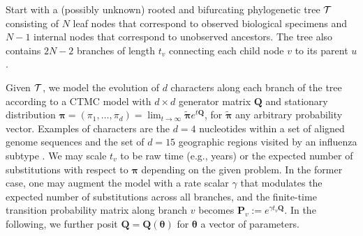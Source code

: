 \documentclass[9pt,twocolumn,twoside]{pnas-new}
\newcommand{\phylogeny}{{\cal T}}
\newcommand{\?}{\textbf{?}}
\newcommand{\QQ}{\mathbf{Q}}
\newcommand{\ttheta}{\boldsymbol{\theta}}
\newcommand{\ppi}{\boldsymbol{\pi}}
\renewcommand{\P}{\mathbf{P}}
\begin{document}
Start with a (possibly unknown) rooted and bifurcating phylogenetic
tree $\phylogeny$ consisting of $N$ leaf nodes that correspond to
observed biological specimens and $N-1$ internal nodes that correspond
to unobserved ancestors.  The tree also contains $2N-2$ branches of
length $t_v$ connecting each child node $v$ to its parent $u$.

Given $\phylogeny$, we model the evolution of $d$ characters along
each branch of the tree according to a CTMC model with $d\times d$
generator matrix $\QQ$ and stationary distribution
$\ppi=(\pi_1,\dots,\pi_d)=\lim_{t\rightarrow
  \infty}\widetilde{\ppi}e^{t\QQ}$, for $\widetilde{\ppi}$ any
arbitrary probability vector.  Examples of characters are the $d=4$
nucleotides within a set of aligned genome sequences
\cite{jukes1969evolution} and the set of $d=15$ geographic regions
visited by an influenza subtype \cite{lemey2014unifying}.  We may
scale $t_v$ to be raw time (e.g., years) or the expected number of
substitutions with respect to $\ppi$ depending on the given problem.
In the former case, one may augment the model with a rate scalar
$\gamma$ that modulates the expected number of substitutions across
all branches, and the finite-time transition probability matrix along
branch $v$ becomes $\P_v:=e^{\gamma t_v \QQ}$.  In the following, we
further posit $\QQ=\QQ(\ttheta)$ for $\ttheta$ a vector of parameters.
 
\end{document}

